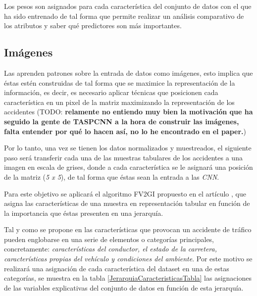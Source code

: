         Los pesos son asignados para cada característica del conjunto de datos con el que ha sido entrenado  de tal forma que permite realizar un análisis comparativo de los atributos y saber qué predictores son más importantes.


    \subsection{Imágenes}


        Las  aprenden patrones sobre la entrada de datos como imágenes, esto implica que éstas estén construidas de tal forma que se maximice la representación de la información, es decir, es necesario aplicar técnicas que posicionen cada característica en un pixel de la matriz maximizando la representación de los accidentes (TODO: \textbf{relamente no entiendo muy bien la motivación que ha seguido la gente de TASPCNN a la hora de construir las imágenes, falta entender por qué lo hacen así, no lo he encontrado en el paper.})

        Por lo tanto, una vez se tienen los datos normalizados y muestreados, el siguiente paso será transferir cada una de las muestras tabulares de los accidentes a una imagen en escala de grises, donde a cada característica se le asignará una posición de la matriz (\textit{5 x 5}), de tal forma que éstas sean la entrada a las \textit{CNN}.

        Para este objetivo se aplicará el algoritmo FV2GI propuesto en el artículo \cite{TASPCNN}, que asigna las características de una muestra en representación tabular en función de la importancia que éstas presenten en una jerarquía.

        Tal y como se propone en \cite{JerarquiaImagenes} las características que provocan un accidente de tráfico pueden englobarse en una serie de elementos o categorías principales, concretamente: \textit{características del conductor, el estado de la carretera, características propias del vehículo y condiciones del ambiente}. Por este motivo se realizará una asignación de cada característica del dataset en una de estas categorías, se muestra en la tabla \ref{JerarquiaCaracteristicasTabla} las asignaciones de las variables explicativas del conjunto de datos en función de esta jerarquía.


